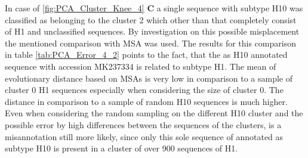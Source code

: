 In case of \autoref{fig:PCA_Cluster_Knee_4} \textbf{\textsf{C}} a single sequence with subtype H10 was classified as belonging to the cluster 2 which other than that completely consist of H1 and unclassified sequences. By investigation on this possible misplacement the mentioned comparison with \gls{MSA} was used. The results for this comparison in table \autoref{tab:PCA_Error_4_2} points to the fact, that the as H10 annotated sequence with accession MK237334 is related to subtype H1. The mean of evolutionary distance based on \glspl{MSA} is very low in comparison to a sample of cluster 0 H1 sequences especially when considering the size of cluster 0. The distance in comparison to a sample of random H10 sequences is much higher. Even when considering the random sampling on the different H10 cluster and the possible error by high differences between the sequences of the clusters, is a misannotation still more likely, since only this sole sequence of annotated as subtype H10 is present in a cluster of over 900 sequences of H1. 

\begin{table}[!hbt]
    \centering
    \caption[Anomalies in Segment 4 Cluster 48 (\Acrshort{PCA})]{\textbf{Anomalies in Segment 4 Cluster 48 (\Acrshort{PCA}).} The \glspl{MSA} mean distance of the given sequences in comparison to a sample of H16 sequences of the same cluster and a sample of H13 sequences present in another cluster. Only the first 20 columns are presented here, the full table can be found in the \href{https://github.com/ahenoch/Masterthesis.git}{Projects GitHub Repository}.}
    \label{tab:PCA_Error_4_48}
\end{table}

